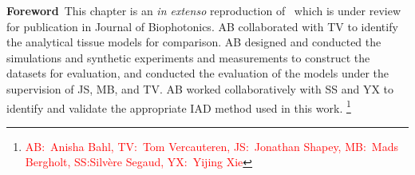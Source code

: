 \begin{center}
\begin{minipage}[b]{0.9\linewidth}
\small
\textbf{Foreword\,}
This chapter is an \emph{in extenso} reproduction of~\citet{Bahl2023a} which is under review for publication in Journal of Biophotonics. 
\newline
AB collaborated with TV to identify the analytical tissue models for comparison. AB 
designed and conducted the simulations and synthetic experiments and measurements to construct the datasets for evaluation, and conducted the evaluation of the models under the supervision of JS, MB, and TV. AB worked collaboratively with SS and YX to identify and validate the appropriate IAD method used in this work. \footnote{\textcolor{red}{AB:~Anisha Bahl, TV:~Tom Vercauteren, JS:~Jonathan Shapey, MB:~Mads Bergholt, SS:Silv\`ere Segaud, YX:~Yijing Xie}}
\end{minipage}
\end{center}

\minitoc



